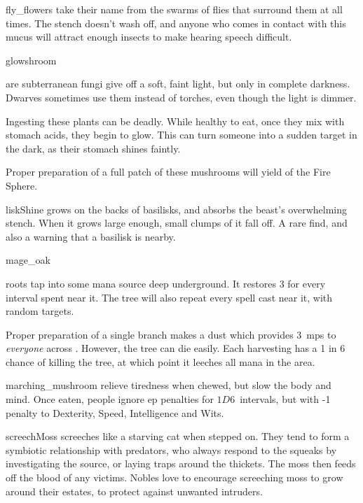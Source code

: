 \begin{multicols}{2}
%
  {fly_flowers}%
  {take their name from the swarms of flies that surround them at all times.
  The stench doesn't wash off, and anyone who comes in contact with this mucus will attract enough insects to make hearing speech difficult.}%

%
  {glowshroom}%
  {are subterranean fungi give off a soft, faint light, but only in complete darkness.
   Dwarves sometimes use them instead of torches, even though the light is dimmer.

   Ingesting these plants can be deadly.
   While healthy to eat, once they mix with stomach acids, they begin to glow.
   This can turn someone into a sudden target in the dark, as their stomach shines faintly.

   Proper preparation of a full patch of these mushrooms will yield  of the Fire Sphere.
    }

%
  {liskShine}%
  {grows on the backs of basilisks, and absorbs the beast's overwhelming stench.
  When it grows large enough, small clumps of it fall off.
  A rare find, and also a warning that a basilisk is nearby.
    }

%
  {mage_oak}%
  {roots tap into some mana source deep underground.
    It restores 3  for every \gls{interval} spent near it.
    The tree will also repeat every spell cast near it, with random targets.

    Proper preparation of a single branch makes a dust which provides 3~\glspl{mp} to \emph{everyone} across .
    However, the tree can die easily.
    Each harvesting has a 1 in 6 chance of killing the tree, at which point it leeches all mana in the \gls{area}.
  }%


%
  {marching_mushroom}%
  {relieve tiredness when chewed, but slow the body and mind.
    Once eaten, people ignore \gls{ep} penalties for $1D6$~\glspl{interval}, but with -1 penalty to Dexterity, Speed, Intelligence and Wits.
    }

%
  {screechMoss}%
  {screeches like a starving cat when stepped on.
  They tend to form a symbiotic relationship with predators, who always respond to the squeaks by investigating the source, or laying traps around the thickets.
  The moss then feeds off the blood of any victims.
  Nobles love to encourage screeching moss to grow around their estates, to protect against unwanted intruders.
    }


\end{multicols}
